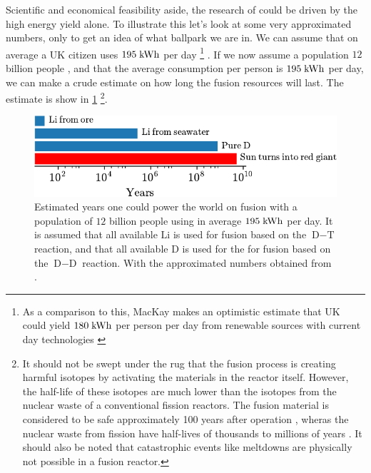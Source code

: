 Scientific and economical feasibility aside, the research of could be driven by the high energy yield alone.
To illustrate this let's look at some very approximated numbers, only to get an idea of what ballpark we are in.
We can assume that on average a UK citizen uses $195 \text{\;kWh}$ per day%
\footnote{As a comparison to this, MacKay makes an optimistic estimate that UK could yield $180 \text{\;kWh}$ per person per day from renewable sources with current day technologies \cite{Mackay2009book}}%
%
\cite{Mackay2009book}.
If we now assume a population $12$ billion people \cite{Melorose2015}, and that the average consumption per person is $195 \text{\;kWh}$ per day, we can make a crude estimate on how long the fusion resources will last.
The estimate is show in \cref{fig:potFusion}%
%
\footnote{It should not be swept under the rug that the fusion process is creating harmful isotopes by activating the materials in the reactor itself.
    However, the half-life of these isotopes are much lower than the isotopes from the nuclear waste of a conventional fission reactors.
    The fusion material is considered to be safe approximately 100 years after operation \cite{Bloom1998}, wheras the nuclear waste from fission have half-lives of thousands to millions of years \cite{Kessler2012book}.
It should also be noted that catastrophic events like meltdowns are physically not possible in a fusion reactor.}.

\begin{figure}[htb]
    \begin{center}
        \includegraphics{fig/intro/fusionSustain}
    \end{center}
    \caption{Estimated years one could power the world on fusion with a population of $12$ billion people using in average $195 \text{\;kWh}$ per day.
        It is assumed that all available $\text{Li}$ is used for fusion based on the $\text{D}-\text{T}$ reaction, and that all available $\text{D}$ is used for the for fusion based on the $\text{D}-\text{D}$ reaction.
        With the approximated numbers obtained from \cite{Melorose2015,Mackay2009book,ongena2012,Eckhartt1995}.}
    \label{fig:potFusion}
\end{figure}
%

